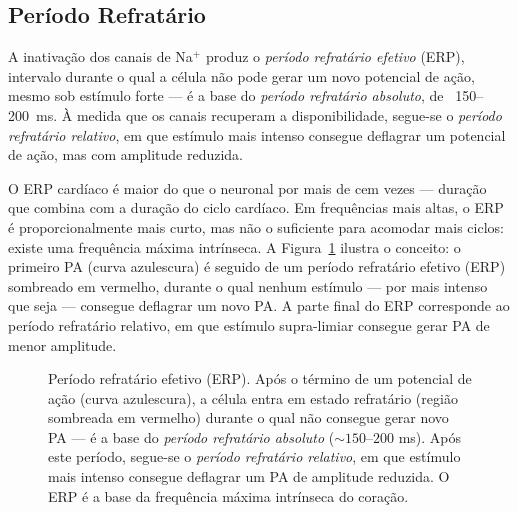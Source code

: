 \subsection{Período Refratário}
\label{sub:image12-refrat}

A inativação dos canais de Na$^+$ produz o \emph{período refratário
efetivo} (ERP), intervalo durante o qual a célula não pode gerar um novo
potencial de ação, mesmo sob estímulo forte --- é a base do
\emph{período refratário absoluto}, de ~150--200~ms. À medida que os
canais recuperam a disponibilidade, segue-se o \emph{período refratário
relativo}, em que estímulo mais intenso consegue deflagrar um potencial
de ação, mas com amplitude reduzida.

O ERP cardíaco é maior do que o neuronal por mais de cem vezes --- duração
que combina com a duração do ciclo cardíaco. Em frequências mais altas,
o ERP é proporcionalmente mais curto, mas não o suficiente para acomodar
mais ciclos: existe uma frequência máxima intrínseca. A
Figura~\ref{fig:12-refrat} ilustra o conceito: o primeiro PA
(curva azulescura) é seguido de um período refratário efetivo (ERP)
sombreado em vermelho, durante o qual nenhum estímulo --- por mais
intenso que seja --- consegue deflagrar um novo PA. A parte final do
ERP corresponde ao período refratário relativo, em que estímulo
supra-limiar consegue gerar PA de menor amplitude.

\begin{figure}[htbp]
\centering
{}
\caption{Período refratário efetivo (ERP). Após o término de um potencial de ação (curva azulescura), a célula entra em estado refratário (região sombreada em vermelho) durante o qual não consegue gerar novo PA --- é a base do \emph{período refratário absoluto} ($\sim 150$--$200$ ms). Após este período, segue-se o \emph{período refratário relativo}, em que estímulo mais intenso consegue deflagrar um PA de amplitude reduzida. O ERP é a base da frequência máxima intrínseca do coração.}
\label{fig:12-refrat}
\end{figure}

